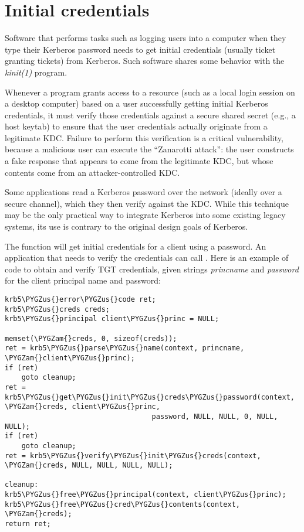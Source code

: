 \documentclass[letterpaper,10pt,english]{sphinxmanual}
\def\PYGZus{\char`\_}
\def\PYGZam{\char`\&}
\begin{document}
\chapter{Initial credentials}
\label{appdev/init_creds:initial-credentials}\label{appdev/init_creds::doc}
Software that performs tasks such as logging users into a computer
when they type their Kerberos password needs to get initial
credentials (usually ticket granting tickets) from Kerberos.  Such
software shares some behavior with the \emph{kinit(1)} program.

Whenever a program grants access to a resource (such as a local login
session on a desktop computer) based on a user successfully getting
initial Kerberos credentials, it must verify those credentials against
a secure shared secret (e.g., a host keytab) to ensure that the user
credentials actually originate from a legitimate KDC.  Failure to
perform this verification is a critical vulnerability, because a
malicious user can execute the ``Zanarotti attack'': the user constructs
a fake response that appears to come from the legitimate KDC, but
whose contents come from an attacker-controlled KDC.

Some applications read a Kerberos password over the network (ideally
over a secure channel), which they then verify against the KDC.  While
this technique may be the only practical way to integrate Kerberos
into some existing legacy systems, its use is contrary to the original
design goals of Kerberos.

The function {\hyperref[appdev/refs/api/krb5_get_init_creds_password:c.krb5_get_init_creds_password]{}} will get initial
credentials for a client using a password.  An application that needs
to verify the credentials can call {\hyperref[appdev/refs/api/krb5_verify_init_creds:c.krb5_verify_init_creds]{}}.
Here is an example of code to obtain and verify TGT credentials, given
strings \emph{princname} and \emph{password} for the client principal name and
password:

\begin{Verbatim}[commandchars=\\\{\}]
krb5\PYGZus{}error\PYGZus{}code ret;
krb5\PYGZus{}creds creds;
krb5\PYGZus{}principal client\PYGZus{}princ = NULL;

memset(\PYGZam{}creds, 0, sizeof(creds));
ret = krb5\PYGZus{}parse\PYGZus{}name(context, princname, \PYGZam{}client\PYGZus{}princ);
if (ret)
    goto cleanup;
ret = krb5\PYGZus{}get\PYGZus{}init\PYGZus{}creds\PYGZus{}password(context, \PYGZam{}creds, client\PYGZus{}princ,
                                   password, NULL, NULL, 0, NULL, NULL);
if (ret)
    goto cleanup;
ret = krb5\PYGZus{}verify\PYGZus{}init\PYGZus{}creds(context, \PYGZam{}creds, NULL, NULL, NULL, NULL);

cleanup:
krb5\PYGZus{}free\PYGZus{}principal(context, client\PYGZus{}princ);
krb5\PYGZus{}free\PYGZus{}cred\PYGZus{}contents(context, \PYGZam{}creds);
return ret;
\end{Verbatim}
\end{document}
